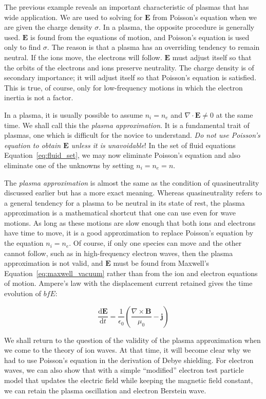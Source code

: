\documentclass[
  notoc %
]{tufte-book}
\begin{document}
The previous example reveals an important characteristic of plasmas that
has wide application. We are used to solving for \(\mathbf{E}\) from
Poisson's equation when we are given the charge density \(\sigma\). In a
plasma, the opposite procedure is generally used. \(\mathbf{E}\) is
found from the equations of motion, and Poisson's equation is used only
to find \(\sigma\). The reason is that a plasma has an overriding
tendency to remain neutral. If the ions move, the electrons will follow.
\(\mathbf{E}\) must adjust itself so that the orbits of the electrons
and ions preserve neutrality. The charge density is of secondary
importance; it will adjust itself so that Poisson's equation is
satisfied. This is true, of course, only for low-frequency motions in
which the electron inertia is not a factor.

In a plasma, it is usually possible to assume \(n_i=n_e\) and
\(\nabla\cdot\mathbf{E}\neq 0\) at the same time. We shall call this the
\emph{plasma approximation}. It is a fundamental trait of plasmas, one
which is difficult for the novice to understand. \emph{Do not use
Poisson's equation to obtain \(\mathbf{E}\) unless it is unavoidable}!
In the set of fluid equations Equation~\ref{eq:fluid_set}, we may now
eliminate Poisson's equation and also eliminate one of the unknowns by
setting \(n_i = n_e = n\).

The \emph{plasma approximation} is almost the same as the condition of
quasineutrality discussed earlier but has a more exact meaning. Whereas
quasineutrality refers to a general tendency for a plasma to be neutral
in its state of rest, the plasma approximation is a mathematical
shortcut that one can use even for wave motions. As long as these
motions are slow enough that both ions and electrons have time to move,
it is a good approximation to replace Poisson's equation by the equation
\(n_i=n_e\). Of course, if only one species can move and the other
cannot follow, such as in high-frequency electron waves, then the plasma
approximation is not valid, and \(\mathbf{E}\) must be found from
Maxwell's Equation~\ref{eq:maxwell_vacuum} rather than from the ion and
electron equations of motion. Ampere's law with the displacement current
retained gives the time evolution of \({bf E}\):

\[
\frac{\mathrm{d}\mathbf{E}}{\mathrm{d}t} = \frac{1}{\epsilon_0}\left( \frac{\nabla\times\mathbf{B}}{\mu_0} - \mathbf{j} \right)
\]

We shall return to the question of the validity of the plasma
approximation when we come to the theory of ion waves. At that time, it
will become clear why we had to use Poisson's equation in the derivation
of Debye shielding. For electron waves, we can also show that with a
simple ``modified'' electron test particle model that updates the
electric field while keeping the magnetic field constant, we can retain
the plasma oscillation and electron Berstein wave.
\end{document}
